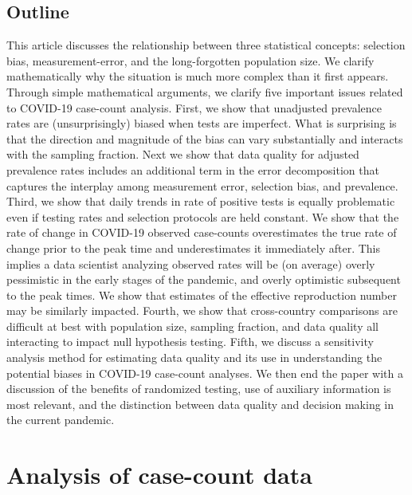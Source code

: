 \documentclass[aoas]{amsart}
\begin{document}

\subsection{Outline}

This article discusses the relationship between three statistical concepts: selection bias, measurement-error, and the long-forgotten population size. We clarify mathematically why the situation is much more complex than it first appears.  Through simple mathematical arguments, we clarify five important issues related to COVID-19 case-count analysis.  First, we show that unadjusted prevalence rates are (unsurprisingly) biased when tests are imperfect. What is surprising is that the direction and magnitude of the bias can vary substantially and interacts with the sampling fraction.  Next we show that data quality for adjusted prevalence rates includes an additional term in the error decomposition that captures the interplay among measurement error, selection bias, and prevalence.  Third, we show that daily trends in rate of positive tests is equally problematic even if testing rates and selection protocols are held constant.  We show that the rate of change in COVID-19 observed case-counts overestimates the true rate of change prior to the peak time and underestimates it immediately after.  This implies a data scientist analyzing observed rates will be (on average) overly pessimistic in the early stages of the pandemic, and overly optimistic subsequent to the peak times.  We show that estimates of the effective reproduction number may be similarly impacted.  Fourth, we show that cross-country comparisons are difficult at best with population size, sampling fraction, and data quality all interacting to impact null hypothesis testing.  Fifth, we discuss a sensitivity analysis method for estimating data quality and its use in understanding the potential biases in COVID-19 case-count analyses.  We then end the paper with a discussion of the benefits of randomized testing, use of auxiliary information is most relevant, and the distinction between data quality and decision making in the current pandemic.

\section{Analysis of case-count data}
\label{section:casecount}
\end{document}

